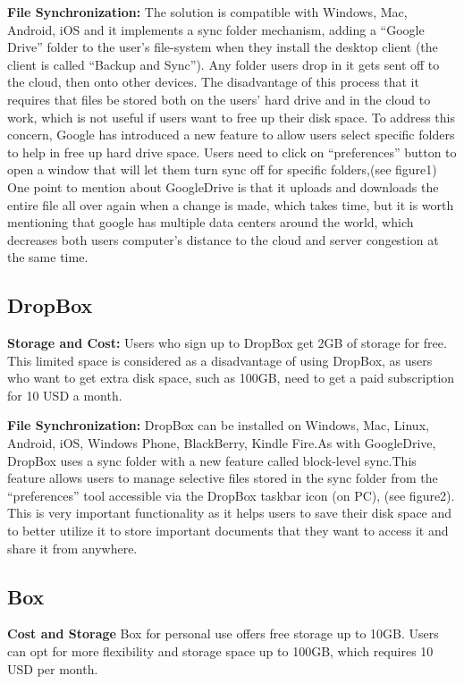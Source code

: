 \documentclass{article}
\begin{document}
\hfill \break %
\textbf{File Synchronization:}
The solution is compatible with Windows, Mac, Android, iOS and it implements a sync folder mechanism, adding a “Google Drive” folder to the user's file-system when they install the desktop client (the client is called “Backup and Sync”). Any folder users drop in it gets sent off to the cloud, then onto other devices. The disadvantage of this process that it requires that files be stored both on the users’ hard drive and in the cloud to work, which is not useful if users want to free up their disk space. To address this concern, Google has introduced a new feature to allow users select specific folders to help in free up hard drive space. Users need to click on “preferences” button to open a window that will let them turn sync off for specific folders,(see figure1)
One point to mention about GoogleDrive is that it uploads and downloads the entire file all over again when a change is made, which takes time, but it is worth mentioning that google has multiple data centers around the world, which decreases both users computer’s distance to the cloud and server congestion at the same time.


\subsection{DropBox}
\textbf{Storage and Cost:}
Users who sign up to DropBox get 2GB of storage for free. This limited space is considered as a disadvantage of using DropBox, as users who want to get extra disk space, such as 100GB, need to get a paid subscription for 10 USD a month.


\hfill \break
\textbf{File Synchronization:}
DropBox can be installed on Windows, Mac, Linux, Android, iOS, Windows Phone, BlackBerry, Kindle Fire.As with GoogleDrive, DropBox uses a sync folder with a new feature called block-level sync.This feature allows users to manage selective files stored in the sync folder from the “preferences” tool accessible via the DropBox taskbar icon (on PC), (see figure2). This is very important functionality as it helps users to save their disk space and to better utilize it to store important documents that they want to access it and share it from anywhere.


\hfill \break

\subsection{Box}
\textbf{Cost and Storage}
Box for personal use offers free storage up to 10GB. Users can opt for more flexibility and storage space up to 100GB, which requires 10 USD per month.
\end{document}
